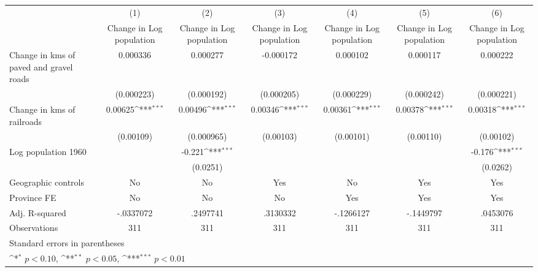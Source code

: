 {
\def\sym#1{\ifmmode^{#1}\else\(^{#1}\)\fi}
\begin{tabular}{l*{6}{c}}
\hline\hline
                    &\multicolumn{1}{c}{(1)}&\multicolumn{1}{c}{(2)}&\multicolumn{1}{c}{(3)}&\multicolumn{1}{c}{(4)}&\multicolumn{1}{c}{(5)}&\multicolumn{1}{c}{(6)}\\
                    &\multicolumn{1}{c}{Change in Log population}&\multicolumn{1}{c}{Change in Log population}&\multicolumn{1}{c}{Change in Log population}&\multicolumn{1}{c}{Change in Log population}&\multicolumn{1}{c}{Change in Log population}&\multicolumn{1}{c}{Change in Log population}\\
\hline
Change in kms of paved and gravel roads&    0.000336         &    0.000277         &   -0.000172         &    0.000102         &    0.000117         &    0.000222         \\
                    &  (0.000223)         &  (0.000192)         &  (0.000205)         &  (0.000229)         &  (0.000242)         &  (0.000221)         \\
[1em]
Change in kms of railroads&     0.00625\sym{***}&     0.00496\sym{***}&     0.00346\sym{***}&     0.00361\sym{***}&     0.00378\sym{***}&     0.00318\sym{***}\\
                    &   (0.00109)         &  (0.000965)         &   (0.00103)         &   (0.00101)         &   (0.00110)         &   (0.00102)         \\
[1em]
Log population 1960 &                     &      -0.221\sym{***}&                     &                     &                     &      -0.176\sym{***}\\
                    &                     &    (0.0251)         &                     &                     &                     &    (0.0262)         \\
\hline
Geographic controls &          No         &          No         &         Yes         &          No         &         Yes         &         Yes         \\
Province FE         &          No         &          No         &          No         &         Yes         &         Yes         &         Yes         \\
Adj. R-squared      &   -.0337072         &    .2497741         &    .3130332         &   -.1266127         &   -.1449797         &    .0453076         \\
Observations        &         311         &         311         &         311         &         311         &         311         &         311         \\
\hline\hline
\multicolumn{7}{l}{\footnotesize Standard errors in parentheses}\\
\multicolumn{7}{l}{\footnotesize \sym{*} \(p<0.10\), \sym{**} \(p<0.05\), \sym{***} \(p<0.01\)}\\
\end{tabular}
}
